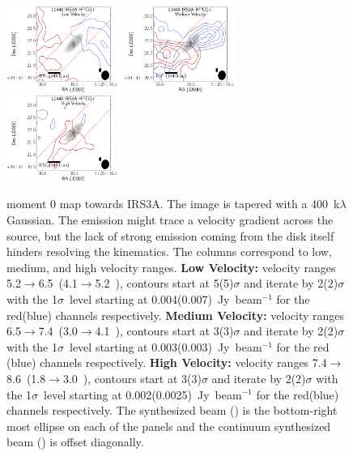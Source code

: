 \begin{figure}[H]
\begin{center}
   \includegraphics[width=0.33\textwidth]{img/L1448IRS3B_H13COp_image_taper400k__low-irs3a.pdf}
   \includegraphics[width=0.33\textwidth]{img/L1448IRS3B_H13COp_image_taper400k__medium-irs3a.pdf}
   \includegraphics[width=0.33\textwidth]{img/L1448IRS3B_H13COp_image_taper400k__high-irs3a.pdf} %
\end{center}
   \caption{\htcop\space moment 0 map towards IRS3A. The image is tapered with a 400~k$\lambda$\space Gaussian. The \htcop\space emission might trace a velocity gradient across the source, but the lack of strong emission coming from the disk itself hinders resolving the kinematics. The columns correspond to low, medium, and high velocity ranges. \textbf{Low Velocity:} velocity ranges 5.2$\rightarrow$6.5~\kms (4.1$\rightarrow$5.2~\kms), contours start at 5(5)$\sigma$ and iterate by 2(2)$\sigma$ with the 1$\sigma$~level starting at 0.004(0.007)~Jy~beam$^{-1}$ for the red(blue) channels respectively. \textbf{Medium Velocity:}  velocity ranges 6.5$\rightarrow$7.4~\kms (3.0$\rightarrow$4.1~\kms), contours start at 3(3)$\sigma$ and iterate by 2(2)$\sigma$ with the 1$\sigma$~level starting at 0.003(0.003)~Jy~beam$^{-1}$ for the red (blue) channels respectively. \textbf{High Velocity:} velocity ranges 7.4$\rightarrow$8.6~\kms (1.8$\rightarrow$3.0~\kms), contours start at 3(3)$\sigma$ and iterate by 2(2)$\sigma$ with the 1$\sigma$~level starting at 0.002(0.0025)~Jy~beam$^{-1}$ for the red(blue) channels respectively. The \htcop\space synthesized beam (\htcopbeam) is the bottom-right most ellipse on each of the panels and the continuum synthesized beam (\contbeam) is offset diagonally.}\label{fig:irs3ah13copmoment}
\end{figure}

